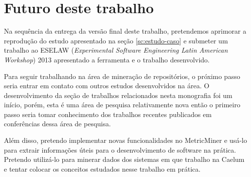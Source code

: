 \documentclass[a4paper, 12pt, twoside]{book}
\begin{document}
    \section{Futuro deste trabalho}
    Na sequência da entrega da versão final deste trabalho, pretendemos aprimorar a reprodução do estudo apresentado na seção \ref{sc:estudo-caso} e submeter um trabalho ao ESELAW (\textit{Experimental Software Engineering Latin American Workshop}) 2013 apresentado a ferramenta e o trabalho desenvolvido.

    Para seguir trabalhando na área de mineração de repositórios, o próximo passo seria entrar em contato com outros estudos desenvolvidos na área. O desenvolvimento da seção de trabalhos relacionados nesta monografia foi um início, porém, esta é uma área de pesquisa relativamente nova então o primeiro passo seria tomar conhecimento dos trabalhos recentes publicados em conferências dessa área de pesquisa.

    Além disso, pretendo implementar novas funcionalidades no MetricMiner e usá-lo para extrair informações úteis para o desenvolvimento de software na prática. Pretendo utilizá-lo para minerar dados dos sistemas em que trabalho na Caelum e tentar colocar os conceitos estudados nesse trabalho em prática.






\end{document}
